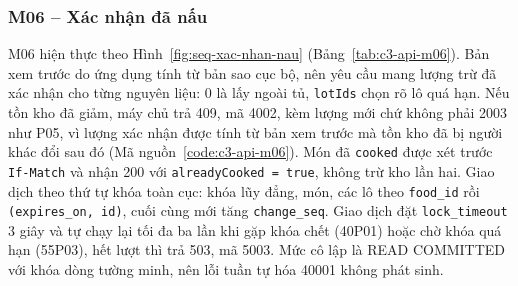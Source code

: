 \subsubsection{M06 – Xác nhận đã nấu}\label{sssec:api-m06}

M06 hiện thực  theo Hình~\ref{fig:seq-xac-nhan-nau} (Bảng~\ref{tab:c3-api-m06}). Bản xem trước do ứng dụng tính từ bản sao cục bộ, nên yêu cầu mang lượng trừ đã xác nhận cho từng nguyên liệu: 0 là lấy ngoài tủ, \texttt{lotIds} chọn rõ lô quá hạn. Nếu tồn kho đã giảm, máy chủ trả 409, mã 4002, kèm lượng mới chứ không phải 2003 như P05, vì lượng xác nhận được tính từ bản xem trước mà tồn kho đã bị người khác đổi sau đó (Mã nguồn~\ref{code:c3-api-m06}). Món đã \texttt{cooked} được xét trước \texttt{If-Match} và nhận 200 với \texttt{alreadyCooked = true}, không trừ kho lần hai. Giao dịch theo thứ tự khóa toàn cục: khóa lũy đẳng, món, các lô theo \texttt{food\_id} rồi \texttt{(expires\_on, id)}, cuối cùng mới tăng \texttt{change\_seq}. Giao dịch đặt \texttt{lock\_timeout} 3 giây và tự chạy lại tối đa ba lần khi gặp khóa chết (40P01) hoặc chờ khóa quá hạn (55P03), hết lượt thì trả 503, mã 5003. Mức cô lập là READ COMMITTED với khóa dòng tường minh, nên lỗi tuần tự hóa 40001 không phát sinh.

